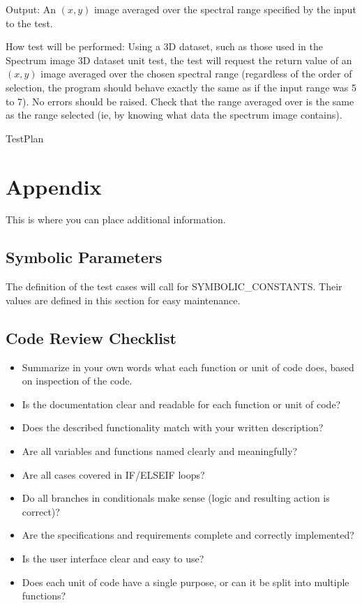 \documentclass[12pt, titlepage]{article}
\begin{document}
\begin{enumerate}
Output: An $(x,y)$ image averaged over the spectral range specified by the input to the test.

How test will be performed: Using a 3D dataset, such as those used in the Spectrum image 3D dataset unit test, the test will request the return value of an $(x,y)$ image averaged over the chosen spectral range (regardless of the order of selection, the program should behave exactly the same as if the input range was 5 to 7). No errors should be raised. Check that the range averaged over is the same as the range selected (ie, by knowing what data the spectrum image contains).

\end{enumerate}

 {TestPlan}

\newpage

\section{Appendix}

This is where you can place additional information.

\subsection{Symbolic Parameters}

The definition of the test cases will call for SYMBOLIC\_CONSTANTS.
Their values are defined in this section for easy maintenance.

\subsection{Code Review Checklist}

\begin{itemize}
\item Summarize in your own words what each function or unit of code does, based on inspection of the code. 
\item Is the documentation clear and readable for each function or unit of code?
\item Does the described functionality match with your written description?
\item Are all variables and functions named clearly and meaningfully?
\item Are all cases covered in IF/ELSEIF loops?
\item Do all branches in conditionals make sense (logic and resulting action is correct)?
\item Are the specifications and requirements complete and correctly implemented?
\item Is the user interface clear and easy to use?
\item Does each unit of code have a single purpose, or can it be split into multiple functions?
\end{itemize}
\end{document}
